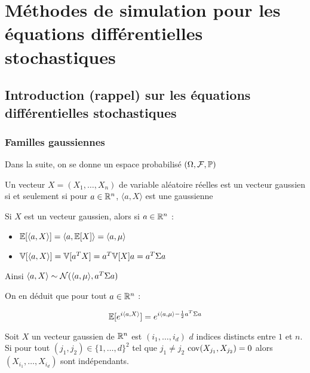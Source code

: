 \chapter{Méthodes de simulation pour les équations différentielles stochastiques}
\section{Introduction (rappel) sur les équations différentielles stochastiques}
\subsection{Familles gaussiennes}

Dans la suite, on se donne un espace probabilisé $(\Omega, \mathcal{F}, \mathbb{P})$

\begin{definition}
  Un vecteur $X=(X_1,\ldots,X_n)$ de variable aléatoire réelles est un vecteur gaussien si et seulement si pour $a\in\mathbb{R}^n$, $\langle a,X \rangle$ est une gaussienne
\end{definition}

Si $X$ est un vecteur gaussien, alors si $a \in \mathbb{R}^n$ :
\begin{itemize}
  \item $\mathbb{E}[ \langle a, X \rangle] = \langle a, \mathbb{E}[X] \rangle = \langle a, \mu \rangle$
  \item $\mathbb{V}[ \langle a, X \rangle] = \mathbb{V}[a^T X] = a^T \mathbb{V}[X] a = a^T \Sigma a$
\end{itemize}

Ainsi $ \langle a,X \rangle\sim \mathcal{N}( \langle a, \mu \rangle, a^T \Sigma a)$

On en déduit que pour tout $a \in \mathbb{R}^n$ :

\[ \mathbb{E}[e^{i \langle a, X \rangle}] = e^{i \langle a, \mu \rangle - \frac{1}{2} a^T \Sigma a} \]

\begin{prop}
Soit $X$ un vecteur gaussien de $\mathbb{R}^n$ est $(i_1,\ldots, i_d)$ $d$ indices distincts entre $1$ et $n$. Si pour tout $(j_1,j_2) \in \{1,\ldots,d\}^2$ tel que $j_1 \neq j_2$ $\mathrm{cov}(X_{j_1},X_{j_2}) = 0$ alors $(X_{i_1}, \ldots, X_{i_d})$ sont indépendants.
\end{prop}

